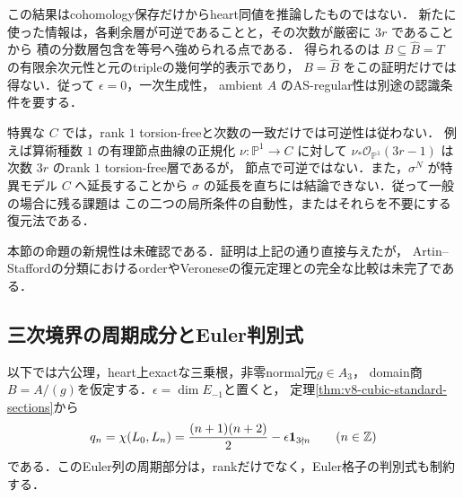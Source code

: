 \documentclass[11pt,a4paper]{ltjsarticle}
\begin{document}
\begin{remark}[正確な到達点と特異曲線で残る障害]
\label{rem:v10-heart-status}
この結果はcohomology保存だけからheart同値を推論したものではない．
新たに使った情報は，各剰余層が可逆であることと，その次数が厳密に $3r$ であることから
積の分数層包含を等号へ強められる点である．
得られるのは $B\subseteq\widehat B=T$ の有限余次元性と元のtripleの幾何学的表示であり，
$B=\widehat B$ をこの証明だけでは得ない．従って $\epsilon=0$，一次生成性，
ambient $A$ のAS-regular性は別途の認識条件を要する．

特異な $C$ では，rank $1$ torsion-freeと次数の一致だけでは可逆性は従わない．
例えば算術種数 $1$ の有理節点曲線の正規化 $\nu:\mathbb P^1\to C$ に対して
$\nu_*\mathcal O_{\mathbb P^1}(3r-1)$ は次数 $3r$ のrank $1$ torsion-free層であるが，
節点で可逆ではない．また，$\sigma^N$ が特異モデル $C$ へ延長することから
$\sigma$ の延長を直ちには結論できない．従って一般の場合に残る課題は
この二つの局所条件の自動性，またはそれらを不要にする復元法である．

本節の命題の新規性は未確認である．証明は上記の通り直接与えたが，
Artin--Staffordの分類におけるorderやVeroneseの復元定理との完全な比較は未完了である．
\end{remark}



\subsection{三次境界の周期成分とEuler判別式}
\label{subsec:v10-cubic-discriminant}
以下では六公理，heart上exactな三乗根，非零normal元$g\in A_3$，
domain商$B=A/(g)$を仮定する．$\epsilon=\dim E_{-1}$と置くと，
定理\ref{thm:v8-cubic-standard-sections}から
\[
 q_n=\chi(L_0,L_n)=\frac{(n+1)(n+2)}2
          -\epsilon\mathbf1_{3\nmid n}\qquad(n\in\mathbb Z)
\]
である．このEuler列の周期部分は，rankだけでなく，Euler格子の判別式も制約する．
\end{document}
